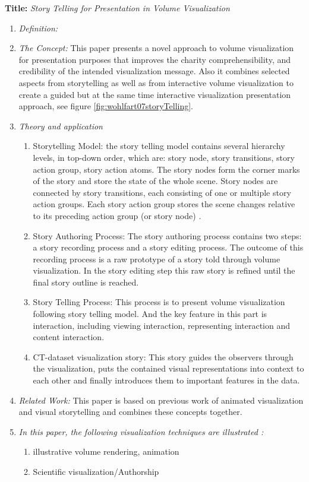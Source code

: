 \documentclass{egpubl}
\begin{document}
\textbf{Title:} \textit{Story Telling for Presentation in Volume Visualization}
\begin{enumerate}
\item \textit{Definition:} 
\item \textit{The Concept:} This paper presents a novel approach to volume visualization for presentation purposes that improves the charity
comprehensibility, and credibility of the intended visualization message. Also it combines selected aspects from storytelling as well as from interactive volume visualization to create a guided but at the same time interactive visualization presentation approach, see figure \ref{fig:wohlfart07storyTelling}\cite{wohlfart2}.
\item \textit{Theory and application}
\begin{enumerate}
\item Storytelling Model: the story telling model contains  several hierarchy levels, in top-down order, which are: story node, story transitions, story action group, story action atoms. The story nodes form the corner marks of the story and store the state of the whole scene. Story nodes are connected by story transitions, each consisting of one or multiple story action groups. Each story action group stores the scene changes relative to its preceding action group (or story node) \cite{wohlfart2}.

\item Story Authoring Process: The story authoring process contains two steps: a story recording process and a story editing process. The outcome of this recording process is a raw prototype of a story told through volume visualization. In the story editing step this raw story is refined until the final story outline is reached.\cite{wohlfart2}
\item Story Telling Process: This process is to present volume visualization following story telling model. And the key feature in this part is interaction, including viewing interaction, representing interaction and content interaction.\cite{wohlfart2}
\item CT-dataset visualization story: This story guides the observers through the visualization, puts the contained visual representations
into context to each other and finally introduces them to important features in the data.\cite{wohlfart2}

\end{enumerate}
\item \textit{Related Work:}  This paper is based on previous work of animated visualization \cite{iserhardt} and visual storytelling \cite{tiede} and combines these concepts together.
\item \textit{In this paper, the following visualization techniques are illustrated :} 
\begin{enumerate}
\item illustrative volume rendering, animation
\item Scientific visualization/Authorship
\end{enumerate}
\end{enumerate}
\end{document}
